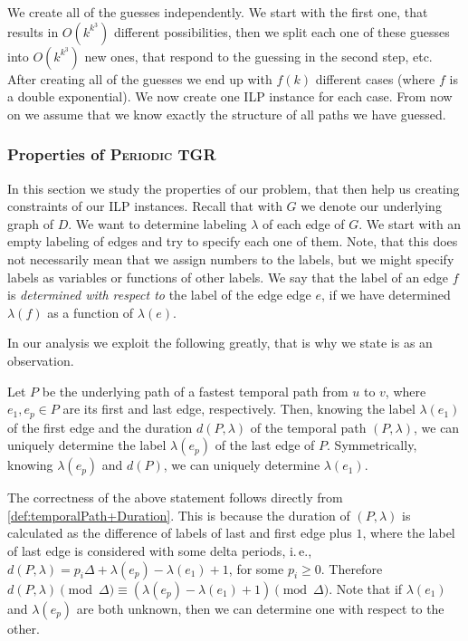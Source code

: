 \documentclass[a4paper,UKenglish,cleveref, autoref, thm-restate]{lipics-v2021}
\newcommand{\ie}{i.\,e.,\ }
\newcommand{\deltaExact}{\textsc{Periodic TGR}}
\begin{document}
%
We create all of the guesses independently.
We start with the first one, that results in $O(k^{k^3})$ different possibilities, then we split each one of these guesses into $O(k^{k^3})$ new ones, that respond to the guessing in the second step, etc.
After creating all of the guesses we end up with $f(k)$ different cases (where $f$ is a double exponential).
We now create one ILP instance for each case.
From now on we assume that we know exactly the structure of all paths we have guessed.

\subsubsection{Properties of \deltaExact}

In this section we study the properties of our problem, that then help us creating constraints of our ILP instances.
Recall that with $G$ we denote our underlying graph of $D$. We want to determine labeling $\lambda$ of each edge of $G$.
We start with an empty labeling of edges and try to specify each one of them.
Note, that this does not necessarily mean that we assign numbers to the labels, but we might specify labels as variables or functions of other labels.
We say that the label of an edge $f$ is \emph{determined with respect to} the label of the edge edge $e$, if we have determined $\lambda(f)$ as a function of $\lambda(e)$. 

In our analysis we exploit the following greatly, that is why we state is as an observation.

\begin{observation}\label{obs:FirstLabelAndDuration}
    Let $P$ be the underlying path of a fastest temporal path from $u$ to $v$, where $e_1, e_p \in P$ are its first and last edge, respectively.
    Then, knowing the label $\lambda (e_1)$ of the first edge and the duration $d(P,\lambda)$ of the temporal path $(P,\lambda)$, we can uniquely determine the label $\lambda (e_p)$ of the last edge of $P$.
    Symmetrically, knowing $\lambda(e_p)$ and $d(P)$, we can uniquely determine $\lambda(e_1)$.
\end{observation}
The correctness of the above statement follows directly from \cref{def:temporalPath+Duration}. This is because the duration of $(P,\lambda)$ is calculated as the difference of labels of last and first edge plus $1$,
where the label of last edge is considered with some delta periods,
\ie $d(P,\lambda) = p_i \Delta + \lambda(e_p) - \lambda (e_1) + 1$, for some $p_i \geq 0$.
Therefore $d(P,\lambda) \pmod \Delta \equiv  (\lambda(e_p) - \lambda (e_1) + 1) \pmod \Delta$.
Note that if $\lambda(e_1)$ and $\lambda(e_p)$ are both unknown, then we can determine one with respect to the other.
\end{document}
